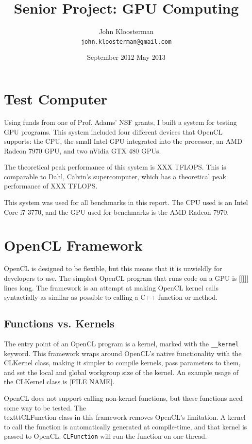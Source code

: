 \documentclass{article}
\begin{document}
\title{Senior Project: GPU Computing}
\author{John Kloosterman \\
  \texttt{john.kloosterman@gmail.com}}
\date{September 2012-May 2013}
\maketitle



\section{Test Computer}
Using funds from one of Prof. Adams' NSF grants, I built a system for testing GPU programs. This system included four different devices that OpenCL supports: the CPU, the small Intel GPU integrated into the processor, an AMD Radeon 7970 GPU, and two nVidia GTX 480 GPUs.

The theoretical peak performance of this system is XXX TFLOPS. This is comparable to Dahl, Calvin's supercomputer, which has a theoretical peak performance of XXX TFLOPS. 

This system was used for all benchmarks in this report. The CPU used is an Intel Core i7-3770, and the GPU used for benchmarks is the AMD Radeon 7970.

\section{OpenCL Framework}
OpenCL is designed to be flexible, but this means that it is unwieldly for developers to use. The simplest OpenCL program that runs code on a GPU is [[[]] lines long. The framework is an attempt at making OpenCL kernel calls syntactially as similar as possible to calling a C++ function or method.

\subsection{Functions vs. Kernels}
The entry point of an OpenCL program is a kernel, marked with the \texttt{\_\_kernel} keyword. This framework wraps around OpenCL's native functionality with the CLKernel class, making it simpler to compile kernels, pass parameters to them, and set the local and global workgroup size of the kernel. An example usage of the CLKernel class is [FILE NAME].

OpenCL does not support calling non-kernel functions, but these functions need some way to be tested. The \\texttt{CLFunction} class in this framework removes OpenCL's limitation. A kernel to call the function is automatically generated at compile-time, and that kernel is passed to OpenCL. \texttt{CLFunction} will run the function on one thread.
\end{document}
